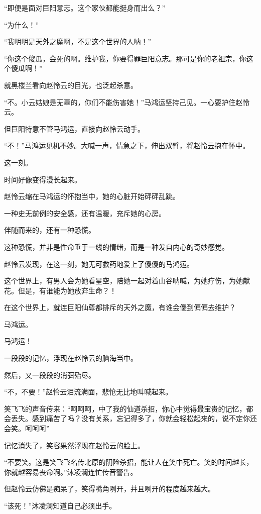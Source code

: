 \begin{this_body}
“即便是面对巨阳意志。这个家伙都能挺身而出么？”

“为什么！”

“我明明是天外之魔啊，不是这个世界的人呐！”

“你这个傻瓜，会死的啊。维护我，你要得罪巨阳意志。那可是你的老祖宗，你这个傻瓜啊！”

就黑楼兰看向赵怜云的目光，也泛起杀意。

“不。小云姑娘是无辜的，你们不能伤害她！”马鸿运坚持己见。一心要护住赵怜云。

但巨阳特意不管马鸿运，直接向赵怜云动手。

“不！”马鸿运见机不妙。大喊一声，情急之下，伸出双臂，将赵怜云抱在怀中。

这一刻。

时间好像变得漫长起来。

赵怜云缩在马鸿运的怀抱当中，她的心脏开始砰砰乱跳。

一种史无前例的安全感，还有温暖，充斥她的心房。

伴随而来的，还有一种恐慌。

这种恐慌，并非是性命垂于一线的情绪，而是一种发自内心的奇妙感觉。

赵怜云发现，在这一刻，她无可救药地爱上了傻傻的马鸿运。

这个世界上，有男人会为她看星空，陪她一起对着山谷呐喊，为她疗伤，为她献花。但是，有谁能为她放弃生命？！

在这个世界上，就连巨阳仙尊都排斥的天外之魔，有谁会傻到偏偏去维护？

马鸿运。

马鸿运！

一段段的记忆，浮现在赵怜云的脑海当中。

然后，又一段段的消弭殆尽。

“不，不要！”赵怜云泪流满面，悲怆无比地叫喊起来。

笑飞飞的声音传来：“呵呵呵，中了我的仙道杀招，你心中觉得最宝贵的记忆，都会丢失。感到痛苦了吗？没有关系，忘记得多了，你就会轻松起来的，说不定你还会笑。呵呵呵”

记忆消失了，笑容果然浮现在赵怜云的脸上。

“不要笑。这是笑飞飞名传北原的阴险杀招，能让人在笑中死亡。笑的时间越长，你就越容易丧命啊。”沐凌澜连忙传音警告。

但赵怜云仿佛是痴呆了，笑得嘴角咧开，并且咧开的程度越来越大。

“该死！”沐凌澜知道自己必须出手。


\end{this_body}
